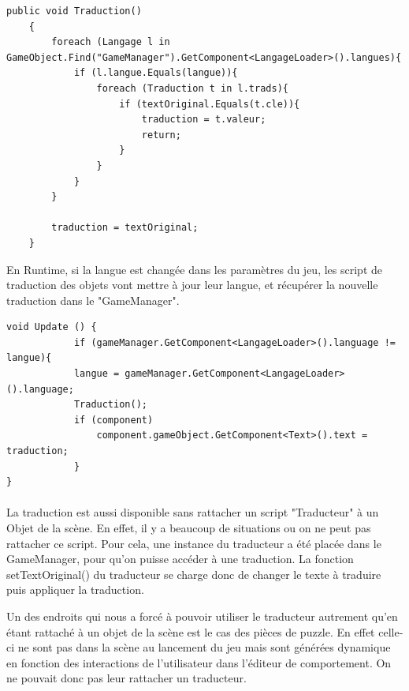 \documentclass{report}
\begin{document}
\begin{lstlisting}[frame=single]
   public void Traduction()
    {
        foreach (Langage l in GameObject.Find("GameManager").GetComponent<LangageLoader>().langues){
            if (l.langue.Equals(langue)){
                foreach (Traduction t in l.trads){
                    if (textOriginal.Equals(t.cle)){
                        traduction = t.valeur;
                        return;
                    }
                }
            }
        }

        traduction = textOriginal;
    }
\end{lstlisting}

En Runtime, si la langue est changée dans les paramètres du jeu, les script de traduction des objets vont mettre à jour leur langue, et récupérer la nouvelle traduction dans le "GameManager".

\begin{lstlisting}[frame=single]
void Update () {
            if (gameManager.GetComponent<LangageLoader>().language != langue){
            langue = gameManager.GetComponent<LangageLoader>().language;
            Traduction();
            if (component)
                component.gameObject.GetComponent<Text>().text = traduction;
            }
}
\end{lstlisting}

\paragraph{}
La traduction est aussi disponible sans rattacher un script "Traducteur" à un Objet de la scène.
En effet, il y a beaucoup de situations ou on ne peut pas rattacher ce script. Pour cela, une instance du traducteur a été placée dans le GameManager, pour qu'on puisse accéder à une traduction.
La fonction setTextOriginal() du traducteur se charge donc de changer le texte à traduire puis appliquer la traduction.

Un des endroits qui nous a forcé à pouvoir utiliser le traducteur autrement qu’en étant rattaché à un objet de la scène est le cas des pièces de puzzle.
En effet celle-ci ne sont pas dans la scène au lancement du jeu mais sont générées dynamique en fonction des interactions de l’utilisateur dans l’éditeur de comportement. 
On ne pouvait donc pas leur rattacher un traducteur.
\end{document}
